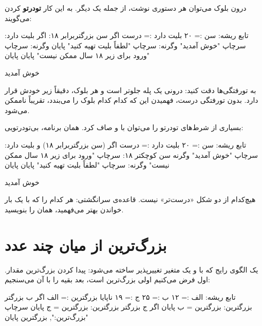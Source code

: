 درون بلوک  می‌توان هر دستوری نوشت، از جمله یک  دیگر.
به این کار \textbf{تودرتو} کردن می‌گویند:

\begin{salamfa}
تابع ریشه:
    سن := ۲۰
    بلیت دارد := درست
    اگر سن بزرگتربرابر ۱۸:
        اگر بلیت دارد:
            سرچاپ "خوش آمدید"
        وگرنه:
            سرچاپ "لطفاً بلیت تهیه کنید"
        پایان
    وگرنه:
        سرچاپ "ورود برای زیر ۱۸ سال ممکن نیست"
    پایان
پایان
\end{salamfa}

\begin{outputfa}
خوش آمدید
\end{outputfa}

به تورفتگی‌ها دقت کنید:  درونی یک پله جلوتر است و 
هر بلوک، دقیقاً زیر  خودش قرار دارد. بدون تورفتگی درست، فهمیدن
این که کدام  کدام بلوک را می‌بندد، تقریباً ناممکن می‌شود.

بسیاری از شرط‌های تودرتو را می‌توان با  و  صاف کرد.
همان برنامه، بی‌تودرتویی:

\begin{salamfa}
تابع ریشه:
    سن := ۲۰
    بلیت دارد := درست
    اگر (سن بزرگتربرابر ۱۸) و بلیت دارد:
        سرچاپ "خوش آمدید"
    وگرنه سن کوچکتر ۱۸:
        سرچاپ "ورود برای زیر ۱۸ سال ممکن نیست"
    وگرنه:
        سرچاپ "لطفاً بلیت تهیه کنید"
    پایان
پایان
\end{salamfa}

\begin{outputfa}
خوش آمدید
\end{outputfa}

هیچ‌کدام از دو شکل «درست‌تر» نیست. قاعده‌ی سرانگشتی: هر کدام را که با یک
بار خواندن بهتر می‌فهمید، همان را بنویسید.

\section{بزرگ‌ترین از میان چند عدد}

یک الگوی رایج که با  و یک متغیر تغییرپذیر ساخته می‌شود: پیدا
کردن بزرگ‌ترین مقدار. اول فرض می‌کنیم اولی بزرگ‌ترین است، بعد بقیه را با آن
می‌سنجیم:

\begin{salamfa}
تابع ریشه:
    الف := ۱۲
    ب := ۲۵
    ج := ۱۹
    ناپایا بزرگترین := الف
    اگر ب بزرگتر بزرگترین: بزرگترین = ب پایان
    اگر ج بزرگتر بزرگترین: بزرگترین = ج پایان
    سرچاپ "بزرگ‌ترین:", بزرگترین
پایان
\end{salamfa}

